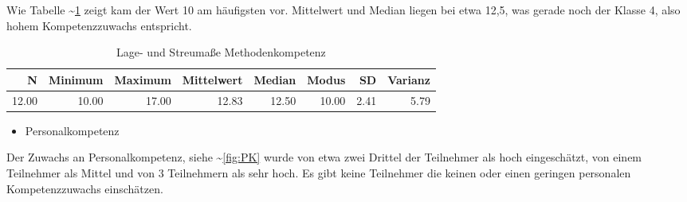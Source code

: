 \documentclass[12pt, bibliography=totoc]{scrartcl}
\begin{document}
Wie Tabelle \textasciitilde{}\ref{tab:lMK} zeigt kam der Wert 10 am
häufigsten vor. Mittelwert und Median liegen bei etwa 12,5, was gerade
noch der Klasse 4, also hohem Kompetenzzuwachs entspricht.

\begin{table}[H]
\centering
\caption{Lage- und Streumaße Methodenkompetenz}
\label{tab:lMK}
\begin{tabular}{rrrrrrrr}
  \hline
  N & Minimum & Maximum & Mittelwert & Median & Modus & SD & Varianz \\
  \hline
  12.00 & 10.00 & 17.00 & 12.83 & 12.50 & 10.00 & 2.41 & 5.79 \\
   \hline
\end{tabular}
\end{table}

\begin{itemize}
\tightlist
\item
  Personalkompetenz
\end{itemize}

Der Zuwachs an Personalkompetenz, siehe \textasciitilde{}\ref{fig:PK}
wurde von etwa zwei Drittel der Teilnehmer als hoch eingeschätzt, von
einem Teilnehmer als Mittel und von 3 Teilnehmern als sehr hoch. Es gibt
keine Teilnehmer die keinen oder einen geringen personalen
Kompetenzzuwachs einschätzen.
\end{document}
